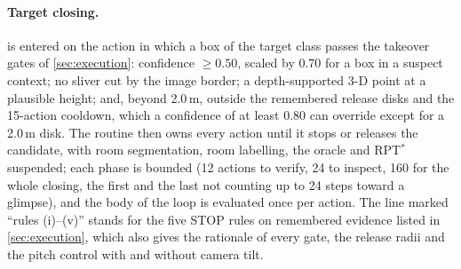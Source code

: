 \documentclass[10pt]{article}
\begin{document}
\paragraph{Target closing.}
 is entered on the action in which a box of the target class passes the takeover gates of \cref{sec:execution}: confidence $\ge 0.50$, scaled by 0.70 for a box in a suspect context; no sliver cut by the image border; a depth-supported 3-D point at a plausible height; and, beyond 2.0\,m, outside the remembered release disks and the 15-action cooldown, which a confidence of at least 0.80 can override except for a 2.0\,m disk. The routine then owns every action until it stops or releases the candidate, with room segmentation, room labelling, the oracle and RPT$^*$ suspended; each phase is bounded (12 actions to verify, 24 to inspect, 160 for the whole closing, the first and the last not counting up to 24 steps toward a glimpse), and the body of the loop is evaluated once per action. The line marked ``rules (i)--(v)'' stands for the five STOP rules on remembered evidence listed in \cref{sec:execution}, which also gives the rationale of every gate, the release radii and the pitch control with and without camera tilt.
\end{document}
